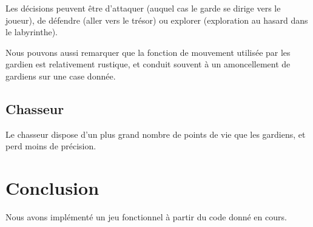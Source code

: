 \documentclass{article}
\begin{document}
Les décisions peuvent être d'attaquer (auquel cas le garde se dirige
vers le joueur), de défendre (aller vers le trésor) ou explorer
(exploration au hasard dans le labyrinthe).




Nous pouvons aussi remarquer que
la fonction de mouvement
utilisée par les gardien est relativement rustique, et conduit
souvent à un amoncellement de gardiens sur une
case donnée.

\subsection{ Chasseur }
Le chasseur dispose d'un plus grand nombre de points de vie que les
gardiens, et perd moins de précision.

\section{ Conclusion }
Nous avons implémenté un jeu fonctionnel à partir du code donné en
cours. 
\end{document}
